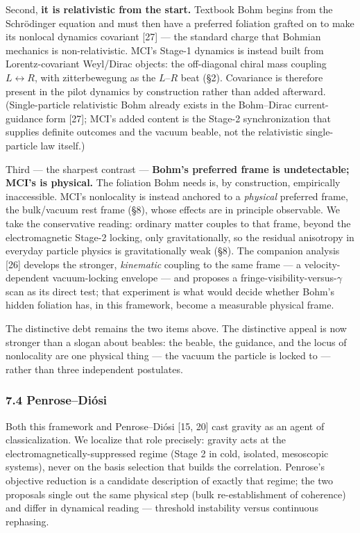 \documentclass[
]{article}
\begin{document}
Second, \textbf{it is relativistic from the start.} Textbook Bohm begins
from the Schrödinger equation and must then have a preferred foliation
grafted on to make its nonlocal dynamics covariant {[}27{]} --- the
standard charge that Bohmian mechanics is non-relativistic. MCI's
Stage-1 dynamics is instead built from Lorentz-covariant Weyl/Dirac
objects: the off-diagonal chiral mass coupling \(L \leftrightarrow R\),
with zitterbewegung as the \(L\)--\(R\) beat (§2). Covariance is
therefore present in the pilot dynamics by construction rather than
added afterward. (Single-particle relativistic Bohm already exists in
the Bohm--Dirac current-guidance form {[}27{]}; MCI's added content is
the Stage-2 synchronization that supplies definite outcomes and the
vacuum beable, not the relativistic single-particle law itself.)

Third --- the sharpest contrast --- \textbf{Bohm's preferred frame is
undetectable; MCI's is physical.} The foliation Bohm needs is, by
construction, empirically inaccessible. MCI's nonlocality is instead
anchored to a \emph{physical} preferred frame, the bulk/vacuum rest
frame (§8), whose effects are in principle observable. We take the
conservative reading: ordinary matter couples to that frame, beyond the
electromagnetic Stage-2 locking, only gravitationally, so the residual
anisotropy in everyday particle physics is gravitationally weak (§8).
The companion analysis {[}26{]} develops the stronger, \emph{kinematic}
coupling to the same frame --- a velocity-dependent vacuum-locking
envelope --- and proposes a fringe-visibility-versus-\(\gamma\) scan as
its direct test; that experiment is what would decide whether Bohm's
hidden foliation has, in this framework, become a measurable physical
frame.

The distinctive debt remains the two items above. The distinctive appeal
is now stronger than a slogan about beables: the beable, the guidance,
and the locus of nonlocality are one physical thing --- the vacuum the
particle is locked to --- rather than three independent postulates.

\subsubsection{7.4 Penrose--Diósi}\label{penrosediuxf3si}

Both this framework and Penrose--Diósi {[}15, 20{]} cast gravity as an
agent of classicalization. We localize that role precisely: gravity acts
at the electromagnetically-suppressed regime (Stage 2 in cold, isolated,
mesoscopic systems), never on the basis selection that builds the
correlation. Penrose's objective reduction is a candidate description of
exactly that regime; the two proposals single out the same physical step
(bulk re-establishment of coherence) and differ in dynamical reading ---
threshold instability versus continuous rephasing.
\end{document}

